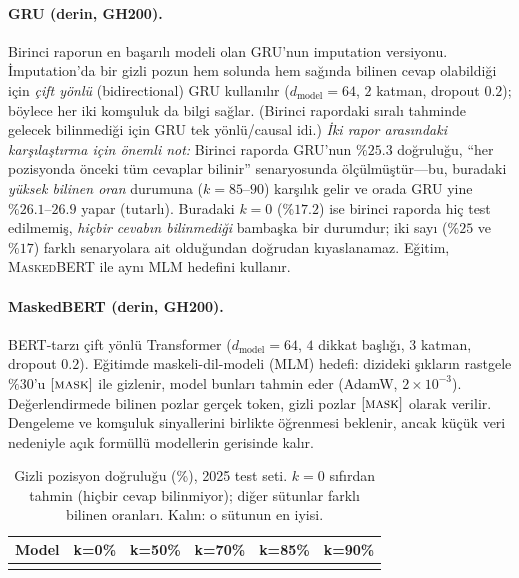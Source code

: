 \documentclass[11pt]{article}
\begin{document}
\paragraph{GRU (derin, GH200).} Birinci raporun en başarılı modeli olan
GRU'nun imputation versiyonu. İmputation'da bir gizli pozun hem solunda hem
sağında bilinen cevap olabildiği için \emph{çift yönlü} (bidirectional) GRU
kullanılır ($d_{\text{model}}=64$, $2$ katman, dropout $0.2$); böylece her iki
komşuluk da bilgi sağlar. (Birinci rapordaki sıralı tahminde gelecek bilinmediği
için GRU tek yönlü/causal idi.)
\emph{İki rapor arasındaki karşılaştırma için önemli not:} Birinci raporda
GRU'nun $\%25.3$ doğruluğu, ``her pozisyonda önceki tüm cevaplar bilinir''
senaryosunda ölçülmüştür---bu, buradaki \emph{yüksek bilinen oran} durumuna
($k\!=\!85\text{--}90$) karşılık gelir ve orada GRU yine $\%26.1\text{--}26.9$
yapar (tutarlı). Buradaki $k\!=\!0$ ($\%17.2$) ise birinci raporda hiç test
edilmemiş, \emph{hiçbir cevabın bilinmediği} bambaşka bir durumdur; iki sayı
($\%25$ ve $\%17$) farklı senaryolara ait olduğundan doğrudan kıyaslanamaz.
Eğitim, \textsc{MaskedBERT} ile aynı MLM
hedefini kullanır.

\paragraph{MaskedBERT (derin, GH200).} BERT-tarzı çift yönlü Transformer
($d_{\text{model}}=64$, $4$ dikkat başlığı, $3$ katman, dropout $0.2$).
Eğitimde maskeli-dil-modeli (MLM) hedefi: dizideki şıkların rastgele $\%30$'u
$[\textsc{mask}]$ ile gizlenir, model bunları tahmin eder (AdamW,
$2\times10^{-3}$). Değerlendirmede bilinen pozlar gerçek token, gizli pozlar
$[\textsc{mask}]$ olarak verilir. Dengeleme ve komşuluk sinyallerini birlikte
öğrenmesi beklenir, ancak küçük veri nedeniyle açık formüllü modellerin
gerisinde kalır.

\begin{table}[H]
\centering
\caption{Gizli pozisyon doğruluğu (\%), 2025 test seti. $k=0$ sıfırdan tahmin
(hiçbir cevap bilinmiyor); diğer sütunlar farklı bilinen oranları. Kalın: o
sütunun en iyisi.}
\label{tab:imput}
\begin{tabular}{lccccc}
\toprule
Model & k=0\% & k=50\% & k=70\% & k=85\% & k=90\% \\
\midrule

\\
\bottomrule
\end{tabular}
\end{table}
\end{document}
